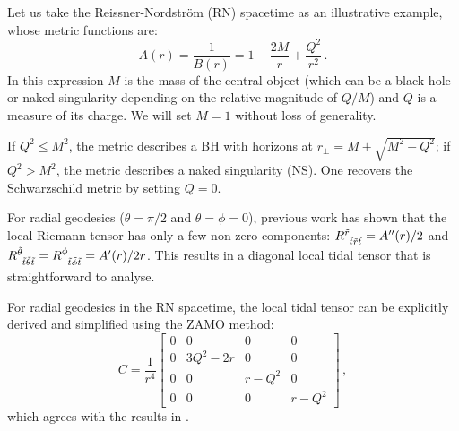\documentclass[
    reprint,
    prd,
    nofootinbib,
    amsmath,amssymb,
    aps,
    floatfix,
]{revtex4-2}
\begin{document}
Let us take the Reissner-Nordström (RN) spacetime as an illustrative example, whose metric functions are:
\begin{equation}
    A(r) = \frac{1}{B(r)} = 1 - \frac{2M}{r} + \frac{Q^{2}}{r^{2}} \, .
\end{equation}
In this expression $M$ is the mass of the central object (which can be a black hole or naked singularity depending on the relative magnitude of $Q/M$) and $Q$ is a measure of its charge. We will set $M = 1$ without loss of generality.

If $Q^{2} \leq M^{2}$, the metric describes a BH with horizons at $r_{\pm} = M \pm \sqrt{M^{2} - Q^{2}}$; if $Q^{2} > M^{2}$, the metric describes a naked singularity (NS). One recovers the Schwarzschild metric by setting $Q = 0$.

For radial geodesics ($\theta = \pi/2$ and $\dot{\theta} = \dot{\phi} = 0$), previous work \cite{Crispino2016} has shown that the local Riemann tensor has only a few non-zero components: $\tensor{R}{^{\tilde{r}}_{\tilde{t}\tilde{r}\tilde{t}}} = A''(r)/2$ and $\tensor{R}{^{\tilde{\theta}}_{\tilde{t}\tilde{\theta}\tilde{t}}} = \tensor{R}{^{\tilde{\phi}}_{\tilde{t}\tilde{\phi}\tilde{t}}} = A'(r)/2r$. This results in a diagonal local tidal tensor that is straightforward to analyse.

For radial geodesics in the RN spacetime, the local tidal tensor can be explicitly derived and simplified using the ZAMO method:
\begin{equation}
    C =
    \frac{1}{r^{4}}
    \begin{bmatrix}
        0 & 0           & 0         & 0         \\
        0 & 3Q^{2} - 2r & 0         & 0         \\
        0 & 0           & r - Q^{2} & 0         \\
        0 & 0           & 0         & r - Q^{2}
    \end{bmatrix} \, ,
\end{equation}
which agrees with the results in \cite{Crispino2016}.
\end{document}
